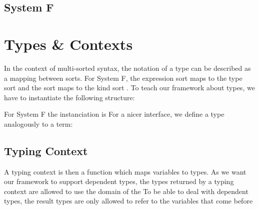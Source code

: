 \documentclass[sigplan,10pt, anonymous]{acmart}
\newenvironment{LibCode*}{%
  \begin{tcolorbox}[%
    colframe=white,%
    boxrule=0.0pt,%
    top=2.5pt,%
    left=2.5pt,%
    bottom=2.5pt,%
    right=2.5pt,%
    boxsep=0pt%
  ]\vspace{-0.2\baselineskip}%
}{%
  \vspace{-1\baselineskip}%
  \end{tcolorbox}%
}
\newcommand*\LibCode[1]{\begin{LibCode*}{#1}\end{LibCode*}}
\newcommand*\AppCode[1]{{#1}}
\newcommand*\ACode[1]{\AgdaFontStyle{\textcolor{mygray}{#1}}}
\newcommand*\ACon[1]{\AgdaInductiveConstructor{#1}}
\begin{document}
  \LibCode\KComposeKit
  \LibCode\KComposition
  \LibCode\KComposeKitAp
  \LibCode\KDistLiftCompose
  \LibCode\KComposeKitNotation
  \LibCode\KComposeTraversal
  \LibCode\KCommLiftWeaken
  \LibCode\KCommLiftWeakenTraverse
  \LibCode\KComposeKitInstances
  \LibCode\KComposeKitInstancesConcrete
  \LibCode\KWeakenCancelsSingle
  \LibCode\KWeakenCancelsSingleTraverse
  \LibCode\KDistLiftSingle
  \LibCode\KDistLiftSingleTraverse

  \subsection{System F}
  \AppCode\FAssoc
  \AppCode\FAssocProofInteresting
  \AppCode\FComposeTraversal

  \section{Types \& Contexts}

  In the context of multi-sorted syntax, the notation of a type can be
  described as a mapping between sorts.
  For System F, the expression sort \ACode{\ACon{𝕖}} maps to the type sort
  \ACode{\ACon{𝕥}} and the sort \ACode{\ACon{𝕥}} maps to the kind sort
  \ACode{\ACon{𝕜}}.
  To teach our framework about types, we have to instantiate the following structure:
  \LibCode\KTypeSorts
  For System F the instanciation is
  \AppCode\FTypes
  For a nicer interface, we define a type analogously to a term:
  \LibCode\KTypes

  \subsection{Typing Context}
  A typing context is then a function which maps variables to types.
  As we want our framework to support dependent types, the types returned by
  a typing context are allowed to use the domain of the 
  To be able to deal with dependent types, the result types are only allowed
  to refer to the variables that come before 
  \LibCode\KContextHelper
  \LibCode\KContexts
  \LibCode\KContextLookup
\end{document}
